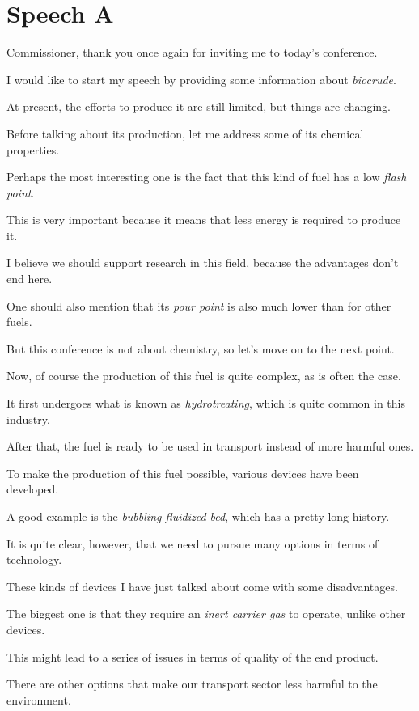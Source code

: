 \appendix

\chapter{Speech A}

\ea Commissioner, thank you once again for inviting me to today's conference.

I would like to start my speech by providing some information about \textit{biocrude}.

At present, the efforts to produce it are still limited, but things are changing.

\ex Before talking about its production, let me address some of its chemical properties.

Perhaps the most interesting one is the fact that this kind of fuel has a low \textit{flash point}.

This is very important because it means that less energy is required to produce it.

\ex I believe we should support research in this field, because the advantages don't end here.

One should also mention that its \textit{pour point} is also much lower than for other fuels.

But this conference is not about chemistry, so let's move on to the next point.

\ex Now, of course the production of this fuel is quite complex, as is often the case.

It first undergoes what is known as \textit{hydrotreating}, which is quite common in this industry.

After that, the fuel is ready to be used in transport instead of more harmful ones.

\ex To make the production of this fuel possible, various devices have been developed.

A good example is the \textit{bubbling fluidized bed}, which has a pretty long history.

It is quite clear, however, that we need to pursue many options in terms of technology.

\ex These kinds of devices I have just talked about come with some disadvantages.

The biggest one is that they require an \textit{inert carrier gas} to operate, unlike other devices.

This might lead to a series of issues in terms of quality of the end product.

\ex There are other options that make our transport sector less harmful to the environment.\label{ex:speechA:Tag2}

